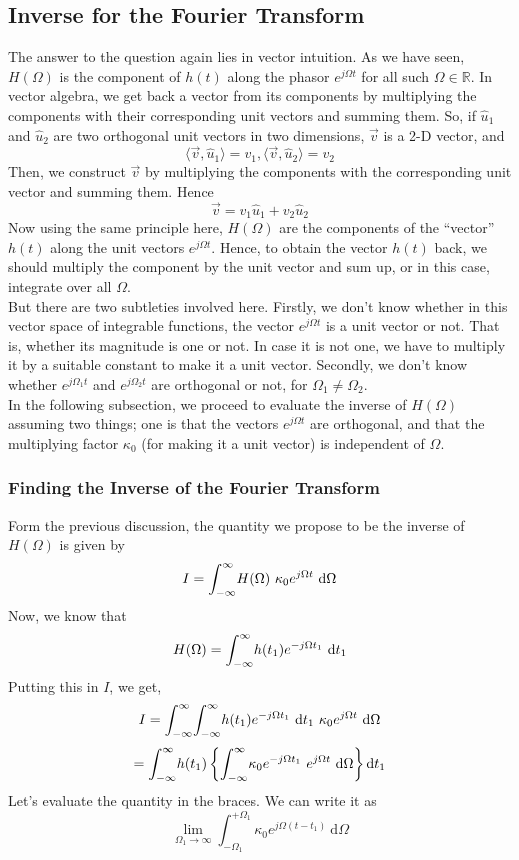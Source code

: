 \subsection{Inverse for the Fourier Transform}
The answer to the question again lies in vector intuition. As we have seen, $H(\Omega)$ is the component of $h(t)$ along the phasor $e^{j\Omega t}$ for all such $\Omega \in \mathbb{R}$. In vector algebra, we get back a vector from its components by multiplying the components with their corresponding unit vectors and summing them. So, if $\hat{u}_1$ and $\hat{u}_2$ are two orthogonal unit vectors in two dimensions, $\overrightarrow{v}$ is a 2-D vector, and
\[
\langle \overrightarrow{v},\hat{u}_1 \rangle = v_1, \langle \overrightarrow{v},\hat{u}_2 \rangle = v_2
\]
Then, we construct $\overrightarrow{v}$ by multiplying the components with the corresponding unit vector and summing them. Hence
\[
\overrightarrow{v} = v_1\hat{u}_1 + v_2\hat{u}_2
\]
Now using the same principle here, $H(\Omega)$ are the components of the ``vector'' $h(t)$ along the unit vectors $e^{j\Omega t}$. Hence, to obtain the vector $h(t)$ back, we should multiply the component by the unit vector and sum up, or in this case, integrate over all $\Omega$.\\
But there are two subtleties involved here. Firstly, we don't know whether in this vector space of integrable functions, the vector $e^{j\Omega t}$ is a unit vector or not. That is, whether its magnitude is one or not. In case it is not one, we have to multiply it by a suitable constant to make it a unit vector. Secondly, we don't know whether $e^{j\Omega_1 t}$ and $e^{j\Omega_2 t}$ are orthogonal or not, for $\Omega_1 \neq \Omega_2$.\\
In the following subsection, we proceed to evaluate the inverse of $H(\Omega)$ assuming two things; one is that the vectors $e^{j\Omega t}$ are orthogonal, and that the multiplying factor $\kappa_0$ (for making it a unit vector) is independent of $\Omega$.
\subsubsection{Finding the Inverse of the Fourier Transform}
Form the previous discussion, the quantity we propose to be the inverse of $H(\Omega)$ is given by
\[
I = \int_{-\infty}^{\infty} \! H(\Omega)\ \kappa_0 e^{j\Omega t} \ \mathrm{d} \Omega
\]
Now, we know that
\[
H(\Omega)= \int_{-\infty}^{\infty} \! h(t_1)e^{-j\Omega t_1} \ \mathrm{d} t_1
\]
Putting this in $I$, we get,
\[
I = \int_{-\infty}^{\infty} \! \int_{-\infty}^{\infty} \! h(t_1)e^{-j\Omega t_1}\ \mathrm{d} t_1 \ \kappa_0 e^{j\Omega t} \ \mathrm{d} \Omega
\]
\[
= \int_{-\infty}^{\infty} \! h(t_1) \left\lbrace \int_{-\infty}^{\infty} \! \kappa_0 e^{-j\Omega t_1} \  e^{j\Omega t} \ \mathrm{d} \Omega \right\rbrace \mathrm{d} t_1
\]
Let's evaluate the quantity in the braces. We can write it as
\[
\lim_{\Omega_1 \to \infty} \int_{-\Omega_1}^{+\Omega_1} \! \kappa_0 e^{j\Omega (t-t_1)} \ \mathrm{d}\Omega
\]

